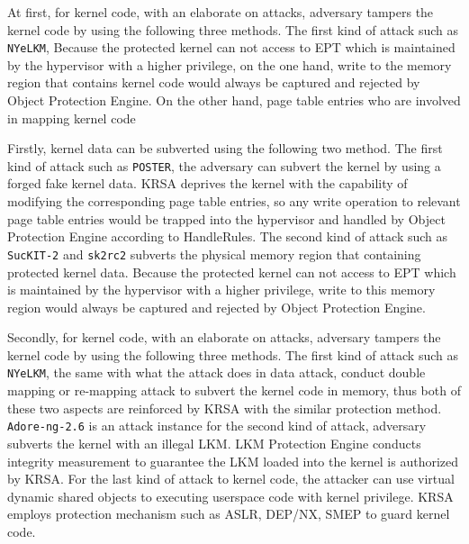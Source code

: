 \documentclass[conference]{IEEEtran}
\begin{document}
At first, for kernel code, with an elaborate on attacks, adversary tampers the kernel code by using the following three methods. The first kind of attack such as \verb|NYeLKM|, Because the protected kernel can not access to EPT which is maintained by the hypervisor with a higher privilege, on the one hand, write to the memory region that contains kernel code would always be captured and rejected by Object Protection Engine. On the other hand, page table entries who are involved in mapping kernel code 

Firstly, kernel data can be subverted using the following two method. The first kind of attack such as \verb|POSTER|, the adversary can subvert the kernel by using a forged fake kernel data. KRSA deprives the kernel with the capability of modifying the corresponding page table entries, so any write operation to relevant page table entries would be trapped into the hypervisor and handled by Object Protection Engine according to HandleRules. The second kind of attack such as \verb|SucKIT-2| and \verb|sk2rc2| subverts the physical memory region that containing protected kernel data. Because the protected kernel can not access to EPT which is maintained by the hypervisor with a higher privilege, write to this memory region would always be captured and rejected by Object Protection Engine. 

Secondly, for kernel code, with an elaborate on attacks, adversary tampers the kernel code by using the following three methods. The first kind of attack such as \verb|NYeLKM|, the same with what the attack does in data attack, conduct double mapping or re-mapping attack to subvert the kernel code in memory, thus both of these two aspects are reinforced by KRSA with the similar protection method. \verb|Adore-ng-2.6| is an attack instance for the second kind of attack, adversary subverts the kernel with an illegal LKM. LKM Protection Engine conducts integrity measurement to guarantee the LKM loaded into the kernel is authorized by KRSA. For the last kind of attack to kernel code, the attacker can use virtual dynamic shared objects to executing userspace code with kernel privilege. KRSA employs protection mechanism such as ASLR, DEP/NX, SMEP to guard kernel code. 


\end{document}

